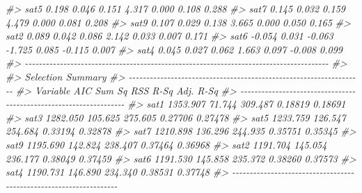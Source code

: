 \documentclass[
]{article}
\newenvironment{Shaded}{\begin{snugshade}}{\end{snugshade}}
\newcommand{\CommentTok}[1]{\textcolor[rgb]{0.56,0.35,0.01}{\textit{#1}}}
\begin{document}
\begin{Shaded}
\begin{Highlighting}[]
\CommentTok{\#\textgreater{}        sat5     0.198         0.046        0.151     4.317    0.000     0.108    0.288 }
\CommentTok{\#\textgreater{}        sat7     0.145         0.032        0.159     4.479    0.000     0.081    0.208 }
\CommentTok{\#\textgreater{}        sat9     0.107         0.029        0.138     3.665    0.000     0.050    0.165 }
\CommentTok{\#\textgreater{}        sat2     0.089         0.042        0.086     2.142    0.033     0.007    0.171 }
\CommentTok{\#\textgreater{}        sat6    {-}0.054         0.031       {-}0.063    {-}1.725    0.085    {-}0.115    0.007 }
\CommentTok{\#\textgreater{}        sat4     0.045         0.027        0.062     1.663    0.097    {-}0.008    0.099 }
\CommentTok{\#\textgreater{} {-}{-}{-}{-}{-}{-}{-}{-}{-}{-}{-}{-}{-}{-}{-}{-}{-}{-}{-}{-}{-}{-}{-}{-}{-}{-}{-}{-}{-}{-}{-}{-}{-}{-}{-}{-}{-}{-}{-}{-}{-}{-}{-}{-}{-}{-}{-}{-}{-}{-}{-}{-}{-}{-}{-}{-}{-}{-}{-}{-}{-}{-}{-}{-}{-}{-}{-}{-}{-}{-}{-}{-}{-}{-}{-}{-}{-}{-}{-}{-}{-}{-}{-}{-}{-}{-}{-}}
\CommentTok{\#\textgreater{} }
\CommentTok{\#\textgreater{}                          Selection Summary                          }
\CommentTok{\#\textgreater{} {-}{-}{-}{-}{-}{-}{-}{-}{-}{-}{-}{-}{-}{-}{-}{-}{-}{-}{-}{-}{-}{-}{-}{-}{-}{-}{-}{-}{-}{-}{-}{-}{-}{-}{-}{-}{-}{-}{-}{-}{-}{-}{-}{-}{-}{-}{-}{-}{-}{-}{-}{-}{-}{-}{-}{-}{-}{-}{-}{-}{-}{-}{-}{-}{-}{-}{-}}
\CommentTok{\#\textgreater{} Variable       AIC       Sum Sq       RSS       R{-}Sq      Adj. R{-}Sq }
\CommentTok{\#\textgreater{} {-}{-}{-}{-}{-}{-}{-}{-}{-}{-}{-}{-}{-}{-}{-}{-}{-}{-}{-}{-}{-}{-}{-}{-}{-}{-}{-}{-}{-}{-}{-}{-}{-}{-}{-}{-}{-}{-}{-}{-}{-}{-}{-}{-}{-}{-}{-}{-}{-}{-}{-}{-}{-}{-}{-}{-}{-}{-}{-}{-}{-}{-}{-}{-}{-}{-}{-}}
\CommentTok{\#\textgreater{} sat1         1353.907     71.744    309.487    0.18819      0.18691 }
\CommentTok{\#\textgreater{} sat3         1282.050    105.625    275.605    0.27706      0.27478 }
\CommentTok{\#\textgreater{} sat5         1233.759    126.547    254.684    0.33194      0.32878 }
\CommentTok{\#\textgreater{} sat7         1210.898    136.296    244.935    0.35751      0.35345 }
\CommentTok{\#\textgreater{} sat9         1195.690    142.824    238.407    0.37464      0.36968 }
\CommentTok{\#\textgreater{} sat2         1191.704    145.054    236.177    0.38049      0.37459 }
\CommentTok{\#\textgreater{} sat6         1191.530    145.858    235.372    0.38260      0.37573 }
\CommentTok{\#\textgreater{} sat4         1190.731    146.890    234.340    0.38531      0.37748 }
\CommentTok{\#\textgreater{} {-}{-}{-}{-}{-}{-}{-}{-}{-}{-}{-}{-}{-}{-}{-}{-}{-}{-}{-}{-}{-}{-}{-}{-}{-}{-}{-}{-}{-}{-}{-}{-}{-}{-}{-}{-}{-}{-}{-}{-}{-}{-}{-}{-}{-}{-}{-}{-}{-}{-}{-}{-}{-}{-}{-}{-}{-}{-}{-}{-}{-}{-}{-}{-}{-}{-}{-}}
\end{Highlighting}
\end{Shaded}
\end{document}
